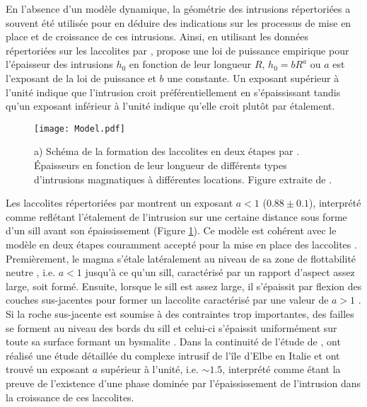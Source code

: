 En  l'absence  d'un  modèle  dynamique, la  géométrie  des  intrusions
répertoriées a  souvent été utilisée  pour en déduire  des indications
sur les processus de mise en place et de croissance de ces intrusions.
Ainsi, en  utilisant les données  répertoriées sur les  laccolites par
\citet{E:2015tl},   \citet{McCaffrey:1997ea}   propose  une   loi   de
puissance empirique pour l'épaisseur  des intrusions $h_0$ en fonction
de leur longueur $R$, $h_0 = bR^a$  ou $a$ est l'exposant de la loi de
puissance  et $b$  une  constante.  Un  exposant  supérieur à  l'unité
indique  que l'intrusion  croit  préférentiellement en  s'épaississant
tandis qu'un exposant inférieur à l'unité indique qu'elle croit plutôt
par étalement.

\begin{figure}[htpb]
  \begin{center}
    \graphicspath{ {/Users/thorey/Documents/These/Manuscript/Figure/Chapter1/} }
    \texttt{[image: Model.pdf]}
    \caption{a) Schéma de  la formation des laccolites  en deux étapes
      par  \citet{McCaffrey:1997ea}.  Épaisseurs  en fonction  de leur
      longueur   de  différents   types  d'intrusions   magmatiques  à
      différentes locations.  Figure extraite de \citet{Cruden:tg}.}
    \label{Model}
  \end{center}
\end{figure}

Les laccolites répertoriées par  \citet{E:2015tl} montrent un exposant
$a<1$  ($0.88 \pm  0.1$),  interprété comme  reflétant l'étalement  de
l'intrusion sur une  certaine distance sous forme d'un  sill avant son
épaississement (Figure  \ref{Model}). Ce  modèle est cohérent  avec le
modèle en  deux étapes couramment  accepté pour  la mise en  place des
laccolites \citep{Johnson:1973ho,McCaffrey:1997ea}.   Premièrement, le
magma s'étale latéralement au niveau de sa zone de flottabilité neutre
,  i.e.  $a<1$  jusqu'à  ce  qu'un sill,  caractérisé  par un  rapport
d'aspect assez large, soit formé.   Ensuite, lorsque le sill est assez
large, il s'épaissit par flexion  des couches sus-jacentes pour former
un    laccolite    caractérisé    par     une    valeur    de    $a>1$
\citep{Johnson:1973ho,Koch:1981if}.   Si  la   roche  sus-jacente  est
soumise à des contraintes trop  importantes, des failles se forment au
niveau des bords du sill et celui-ci s'épaissit uniformément sur toute
sa surface formant un  bysmalite \citep{E:2015tl}.  Dans la continuité
de  l'étude  de  \citet{McCaffrey:1997ea},  \citet{Rocchi:2002jy}  ont
réalisé une  étude détaillée du  complexe intrusif de l'île  d'Elbe en
Italie  et  ont trouvé  un  exposant  $a$  supérieur à  l'unité,  i.e.
$\sim  1.5$, interprété  comme étant  la preuve  de l'existence  d'une
phase dominée  par l'épaississement de l'intrusion  dans la croissance
de ces laccolites.

